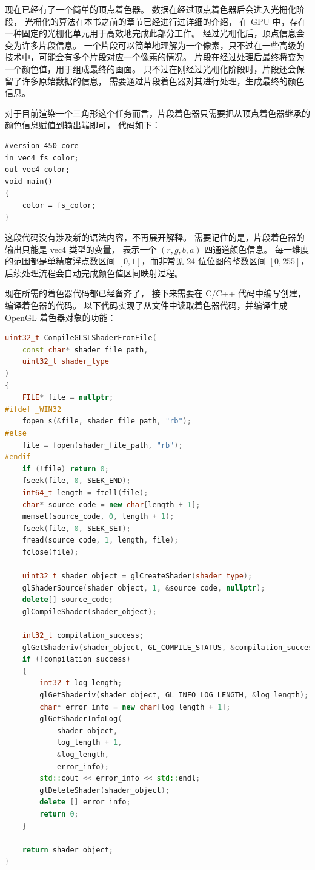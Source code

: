 \documentclass[fontset=windows]{ctexart}
\begin{document}
现在已经有了一个简单的顶点着色器。
数据在经过顶点着色器后会进入光栅化阶段，
光栅化的算法在本书之前的章节已经进行过详细的介绍，
在 GPU 中，存在一种固定的光栅化单元用于高效地完成此部分工作。
经过光栅化后，顶点信息会变为许多片段信息。
一个片段可以简单地理解为一个像素，只不过在一些高级的技术中，可能会有多个片段对应一个像素的情况。
片段在经过处理后最终将变为一个颜色值，用于组成最终的画面。
只不过在刚经过光栅化阶段时，片段还会保留了许多原始数据的信息，
需要通过片段着色器对其进行处理，生成最终的颜色信息。

对于目前渲染一个三角形这个任务而言，片段着色器只需要把从顶点着色器继承的颜色信息赋值到输出端即可，
代码如下：

\begin{lstlisting}
#version 450 core
in vec4 fs_color;
out vec4 color;
void main()
{
    color = fs_color;
}
\end{lstlisting}

这段代码没有涉及新的语法内容，不再展开解释。
需要记住的是，片段着色器的输出只能是 vec4 类型的变量，
表示一个 $(r,g,b,a)$ 四通道颜色信息。
每一维度的范围都是单精度浮点数区间 $[0, 1]$，而非常见 24 位位图的整数区间 $[0,255]$，
后续处理流程会自动完成颜色值区间映射过程。

现在所需的着色器代码都已经备齐了，
接下来需要在 C/C++ 代码中编写创建，编译着色器的代码。
以下代码实现了从文件中读取着色器代码，并编译生成 OpenGL 着色器对象的功能：

\begin{lstlisting}[language=c++]
uint32_t CompileGLSLShaderFromFile(
    const char* shader_file_path,
    uint32_t shader_type
)
{
    FILE* file = nullptr;
#ifdef _WIN32
    fopen_s(&file, shader_file_path, "rb");
#else
    file = fopen(shader_file_path, "rb");
#endif
    if (!file) return 0;
    fseek(file, 0, SEEK_END);
    int64_t length = ftell(file);
    char* source_code = new char[length + 1];
    memset(source_code, 0, length + 1);
    fseek(file, 0, SEEK_SET);
    fread(source_code, 1, length, file);
    fclose(file);

    uint32_t shader_object = glCreateShader(shader_type);
    glShaderSource(shader_object, 1, &source_code, nullptr);
    delete[] source_code;
    glCompileShader(shader_object);

    int32_t compilation_success;
    glGetShaderiv(shader_object, GL_COMPILE_STATUS, &compilation_success);
    if (!compilation_success)
    {
        int32_t log_length;
        glGetShaderiv(shader_object, GL_INFO_LOG_LENGTH, &log_length);
        char* error_info = new char[log_length + 1];
        glGetShaderInfoLog(
            shader_object,
            log_length + 1,
            &log_length,
            error_info);
        std::cout << error_info << std::endl;
        glDeleteShader(shader_object);
        delete [] error_info;
        return 0;
    }

    return shader_object;
}
\end{lstlisting}
\end{document}
